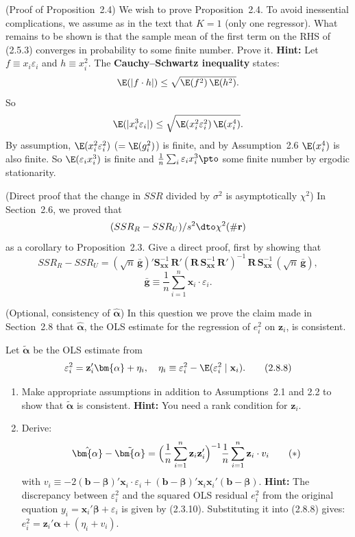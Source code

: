 \begin{problemset}
\exercise[4] (Proof of Proposition~2.4)\quad
We wish to prove Proposition~2.4. To avoid inessential complications, we assume as in the text that $K = 1$ (only one regressor).
What remains to be shown is that the sample mean of the first term on the RHS
of (2.5.3) converges in probability to some finite number. Prove it.
\textbf{Hint:} Let $f \equiv x_i\varepsilon_i$ and $h \equiv x_i^2$. The \textbf{Cauchy--Schwartz inequality} states:
\[
\E(|f \cdot h|) \leq \sqrt{\E(f^2)\,\E(h^2)}.
\]
So
\[
\E(|x_i^3\varepsilon_i|) \leq \sqrt{\E(x_i^2\varepsilon_i^2)\,\E(x_i^4)}.
\]
By assumption, $\E(x_i^2\varepsilon_i^2)$ ($= \E(g_i^2)$) is finite, and by Assumption~2.6
$\E(x_i^4)$ is also finite.
So $\E(\varepsilon_i x_i^3)$ is finite and
$\frac{1}{n}\sum_i \varepsilon_i x_i^3 \pto$ some finite number by ergodic stationarity.

\exercise[5] (Direct proof that the change in $SSR$ divided by $\sigma^2$ is asymptotically
$\chi^2$)\quad
In Section~2.6, we proved that
\[
(SSR_R - SSR_U)/s^2 \dto \chi^2(\#\mathbf{r})
\]
as a corollary to Proposition~2.3. Give a direct proof, first by showing that
\[
SSR_R - SSR_U = (\sqrt{n}\,\bar{\mathbf{g}})'
\mathbf{S}_{\mathbf{xx}}^{-1}\,\mathbf{R}'
(\mathbf{R}\,\mathbf{S}_{\mathbf{xx}}^{-1}\,\mathbf{R}')^{-1}\,
\mathbf{R}\,\mathbf{S}_{\mathbf{xx}}^{-1}\,(\sqrt{n}\,\bar{\mathbf{g}}),
\]
\[
\bar{\mathbf{g}} \equiv \frac{1}{n}\sum_{i=1}^{n}\mathbf{x}_i \cdot \varepsilon_i.
\]

\exercise[6] (Optional, consistency of $\hat{\bm{\alpha}}$)\quad
In this question we prove the claim made in Section~2.8 that $\hat{\bm{\alpha}}$, the OLS estimate for the regression of $e_i^2$ on $\mathbf{z}_i$, is consistent.

Let $\tilde{\bm{\alpha}}$ be the OLS estimate from
%
\begin{equation}
\varepsilon_i^2 = \mathbf{z}_i'\bm{\alpha} + \eta_i,
\quad \eta_i \equiv \varepsilon_i^2 - \E(\varepsilon_i^2 \mid \mathbf{x}_i).
\tag{2.8.8}
\end{equation}

\begin{enumerate}[label=(\alph*)]
\item Make appropriate assumptions in addition to Assumptions~2.1 and 2.2 to
show that $\tilde{\bm{\alpha}}$ is consistent.
\textbf{Hint:} You need a rank condition for $\mathbf{z}_i$.

\item Derive:
\[
\hat{\bm{\alpha}} - \tilde{\bm{\alpha}}
= \Bigl(\frac{1}{n}\sum_{i=1}^{n}\mathbf{z}_i\mathbf{z}_i'\Bigr)^{-1}
\frac{1}{n}\sum_{i=1}^{n}\mathbf{z}_i \cdot v_i
\tag{$*$}
\]
with $v_i \equiv -2(\mathbf{b} - \bm{\beta})'\mathbf{x}_i\cdot\varepsilon_i
+ (\mathbf{b} - \bm{\beta})'\mathbf{x}_i\mathbf{x}_i'(\mathbf{b} - \bm{\beta})$.
\textbf{Hint:} The discrepancy between $\varepsilon_i^2$ and the squared OLS residual $e_i^2$ from the
original equation $y_i = \mathbf{x}_i'\bm{\beta} + \varepsilon_i$ is given by (2.3.10). Substituting it into
(2.8.8) gives: $e_i^2 = \mathbf{z}_i'\bm{\alpha} + (\eta_i + v_i)$.


\end{enumerate}
\end{problemset}
